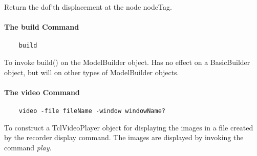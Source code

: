 \documentclass[12pt]{article}
\begin{document}
\noindent Return the dof'th displacement at the node nodeTag.


\paragraph {The build Command}

{\sf\small
\begin{verbatim}
    build
\end{verbatim}
}

\noindent To invoke build() on the ModelBuilder object. Has no effect
on a BasicBuilder object, but will on other types of ModelBuilder objects.

\paragraph {The video Command}

{\sf\small
\begin{verbatim}
    video -file fileName -window windowName?
\end{verbatim}
}

\noindent To construct a TclVideoPlayer object for displaying the images in a file
created by the recorder display command. The images are displayed by invoking the 
command {\em play}.
\end{document}
